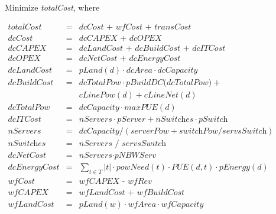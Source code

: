 \begin{figure}
\begin{scriptsize}
\begin{center}
Minimize {\em totalCost}, where
\end{center}
\begin{eqnarray}
  \textit{totalCost}&=&\textit{dcCost + wfCost + transCost} \\
  \textit{dcCost}&=& \textit{dcCAPEX + dcOPEX} \\
  \textit{dcCAPEX}&=& \textit{dcLandCost + dcBuildCost + dcITCost} \\
  \textit{dcOPEX}&=& \textit{dcNetCost + dcEnergyCost} \\
  \textit{dcLandCost}&=& \textit{pLand}(d) \cdot  \textit{dcArea} \cdot  \textit{dcCapacity} \\
  \textit{dcBuildCost}&=& \textit{dcTotalPow} \cdot  \textit{pBuildDC(dcTotalPow)} + \nonumber\\
                      &  & \textit{cLinePow}(d) +  \textit{cLineNet}(d) \\
  \textit{dcTotalPow} &=&  \textit{dcCapacity} \cdot  \textit{maxPUE}(d) \\
  \textit{dcITCost}&=& \textit{nServers} \cdot  \textit{pServer} +  \textit{nSwitches} \cdot
                       \textit{pSwitch} \\
  \textit{nServers}&=& \textit{dcCapacity} / ( \textit{serverPow} %
                       +  \textit{switchPow} /  \textit{servsSwitch})\\
  \textit{nSwitches}&=& \textit{nServers / servsSwitch}\\
  \textit{dcNetCost}&=& \textit{nServers} \cdot  \textit{pNBWServ} \\
  \textit{dcEnergyCost}&=&\sum_{t \in T} {|t| \cdot  \textit{powNeed}(t) \cdot  \textit{PUE}(d,t) \cdot
                           \textit{pEnergy}(d) } \\
  \textit{wfCost}&=& \textit{wfCAPEX - wfRev}  \\
  \textit{wfCAPEX}&=& \textit{wfLandCost + wfBuildCost} \\
  \textit{wfLandCost}&=& \textit{pLand}(w) \cdot  \textit{wfArea} \cdot  \textit{wfCapacity} \\

\end{eqnarray}
\end{scriptsize}
\end{figure}
